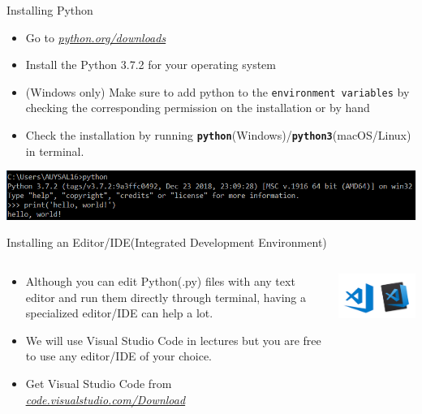 	 	\begin{frame}{Installing Python}
			\LARGE
			\begin{itemize}
				\item Go to \href{https://www.python.org/downloads/}{\underline{\textit{python.org/downloads}}}
				\pause
				\item Install the Python 3.7.2 for your operating system
				\pause
				\item (Windows only) Make sure to add python to the \texttt{environment variables} by checking the corresponding permission on the installation or by hand
				\pause
				\item Check the installation by running \textbf{\texttt{python}}(Windows)/\textbf{\texttt{python3}}(macOS/Linux) in terminal.
			\end{itemize}
			\includegraphics[width=\textwidth]{images/cmd_helloworld.png}
		\end{frame}
		 
		\begin{frame}[t]{Installing an Editor/IDE(Integrated Development Environment)}
			\vspace{-4mm}
			\begin{columns}[t] 
				\begin{column}[t]{0.66\linewidth}
					\LARGE
					\begin{itemize}
						\item Although you can edit Python(.py) files with any text editor and run them directly through terminal, having a specialized editor/IDE can help a lot. 
						\item We will use Visual Studio Code in lectures but you are free to use any editor/IDE of your choice.
						\item Get Visual Studio Code from \href{https://code.visualstudio.com/Download}{\underline{\textit{code.visualstudio.com/Download}}}
					\end{itemize}
				\end{column}
				
				\begin{column}{0.33\linewidth}
					\begin{center}
						\includegraphics[width=0.8\linewidth]{images/vscode.png}						
					\end{center}
				\end{column}
			\end{columns}
	 	\end{frame}

